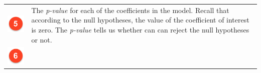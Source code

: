 \documentclass[]{article}
\theoremstyle{definition}
\theoremstyle{definition}
\theoremstyle{definition}
\theoremstyle{remark}
\begin{document}
\begin{longtable}[]{@{}ll@{}}
\begin{minipage}[t]{0.08\columnwidth}
\includegraphics[width=1.00000\textwidth]{./img/circle5.png}\strut
\end{minipage} & \begin{minipage}[t]{0.86\columnwidth}\raggedright\strut
The \emph{p-value} for each of the coefficients in the model. Recall
that according to the null hypotheses, the value of the coefficient of
interest is zero. The \emph{p-value} tells us whether can can reject the
null hypotheses or not.\strut
\end{minipage}\tabularnewline
\begin{minipage}[t]{0.08\columnwidth}\raggedright\strut
\includegraphics[width=1.00000\textwidth]{./img/circle6.png}\strut

\end{minipage}
\end{longtable}
\end{document}
